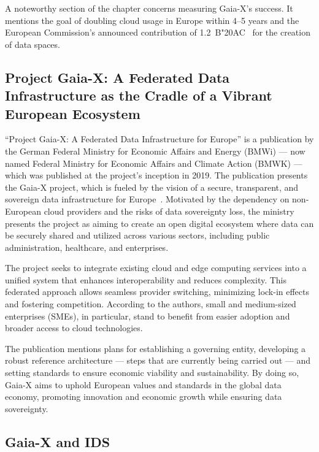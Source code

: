 A noteworthy section of the chapter concerns measuring Gaia-X's success.
It mentions the goal of doubling cloud usage in Europe within 4--5 years and the European Commission's announced contribution of 1.2~B\char"20AC~ for the creation of data spaces.

\subsection{Project Gaia-X: A Federated Data Infrastructure as the Cradle of a Vibrant European Ecosystem}\label{subsec:project-gaia-x:-a-federated-data-infrastructure-as-the-cradle-of-a-vibrant-european-ecosystem}

``Project Gaia-X: A Federated Data Infrastructure for Europe'' is a publication by the German Federal Ministry for Economic Affairs and Energy (BMWi) --- now named Federal Ministry for Economic Affairs and Climate Action (BMWK) --- which was published at the project's inception in 2019.
The publication presents the Gaia-X project, which is fueled by the vision of a secure, transparent, and sovereign data infrastructure for Europe~\cite{project_gaia_x}.
Motivated by the dependency on non-European cloud providers and the risks of data sovereignty loss, the ministry presents the project as aiming to create an open digital ecosystem where data can be securely shared and utilized across various sectors, including public administration, healthcare, and enterprises.

The project seeks to integrate existing cloud and edge computing services into a unified system that enhances interoperability and reduces complexity.
This federated approach allows seamless provider switching, minimizing lock-in effects and fostering competition.
According to the authors, small and medium-sized enterprises (SMEs), in particular, stand to benefit from easier adoption and broader access to cloud technologies.

The publication mentions plans for establishing a governing entity, developing a robust reference architecture --- steps that are currently being carried out --- and setting standards to ensure economic viability and sustainability.
By doing so, Gaia-X aims to uphold European values and standards in the global data economy, promoting innovation and economic growth while ensuring data sovereignty.

\subsection{Gaia-X and IDS}\label{subsec:gaia-x-and-ids}

